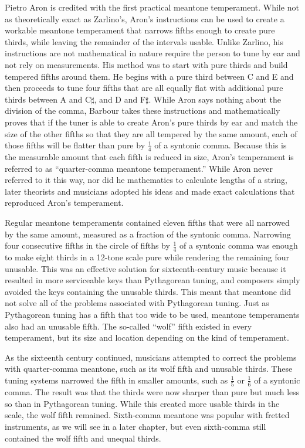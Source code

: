Pietro Aron is credited with the first practical meantone temperament.  While not as theoretically
exact as Zarlino's, Aron's instructions can be used to create a workable meantone temperament that
narrows fifths enough to create pure thirds, while leaving the remainder of the intervals usable.
Unlike Zarlino, his instructions are not mathematical in nature require the person to tune by ear
and not rely on measurements.  His method was to start with pure thirds and build tempered fifths
around them.  He begins with a pure third between C and E and then proceeds to tune four fifths that
are all equally flat with additional pure thirds between A and C$\sharp$, and D and F$\sharp$.
While Aron says nothing about the division of the comma, Barbour takes these instructions and
mathematically proves that if the tuner is able to create Aron's pure thirds by ear and match the
size of the other fifths so that they are all tempered by the same amount, each of those fifths will
be flatter than pure by $ \frac{1}{4} $ of a syntonic comma.\autocite[27]{MB:1}  Because this is the
measurable amount that each fifth is reduced in size, Aron's temperament is referred to as
``quarter-comma meantone temperament.'' While Aron never referred to it this way, nor did he
mathematics to calculate lengths of a string, later theorists and musicians adopted his ideas and made
exact calculations that reproduced Aron's temperament.

Regular meantone temperaments contained eleven fifths that were all narrowed by the same
amount, measured as a fraction of the syntonic comma. Narrowing
four consecutive fifths in the circle of fifths by $ \frac{1}{4} $ of a syntonic comma was
enough to make eight thirds in a 12-tone scale pure while rendering the remaining four
unusable.\autocite[33]{RD:1}  This was an effective solution for
sixteenth-century music because it resulted in more serviceable keys than Pythagorean
tuning, and composers simply avoided the keys containing the unusable thirds.
This meant that meantone did not solve all of the problems associated with
Pythagorean tuning.  Just as Pythagorean tuning has a fifth that too wide to be used,
meantone temperaments also had an unusable fifth.  The so-called ``wolf'' fifth existed in
every temperament, but its size and location depending on the kind of temperament.

As the sixteenth century continued, musicians attempted to correct the problems with
quarter-comma meantone, such as its wolf fifth and unusable thirds.
These tuning systems narrowed the fifth in smaller amounts, such as $
\frac{1}{5} $ or $ \frac{1}{6} $ of a syntonic comma. The result was that the thirds were
now sharper than pure but much less so than in Pythagorean tuning.  While this created
more usable thirds in the scale, the wolf fifth remained.  Sixth-comma meantone was
popular with fretted instruments, as we will see in a later chapter, but even sixth-comma
still contained the wolf fifth and unequal thirds.

